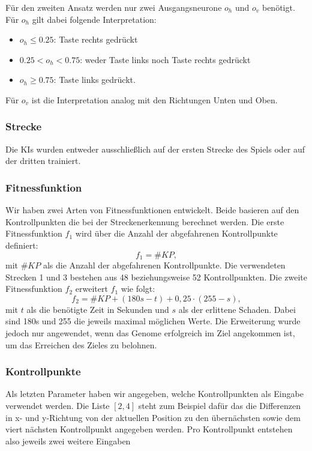 \documentclass[11pt,final,journal,a4paper,towside,towcolumn]{IEEEtran}
\begin{document}
Für den zweiten Ansatz werden nur zwei Ausgangsneurone $o_h$ und $o_v$ benötigt. Für $o_h$ gilt dabei folgende Interpretation:
\begin{itemize}
	\item $o_h\leq 0.25$: Taste rechts gedrückt
	\item $0.25 < o_h <0.75$: weder Taste links noch Taste rechts gedrückt
	\item $o_h\geq 0.75$: Taste links gedrückt.
\end{itemize}
Für $o_v$ ist die Interpretation analog mit den Richtungen Unten und Oben.

\subsubsection*{Strecke}
Die \acp{KI} wurden entweder ausschließlich auf der ersten Strecke des Spiels oder auf der dritten trainiert.

\subsubsection*{Fitnessfunktion}
Wir haben zwei Arten von Fitnessfunktionen entwickelt. Beide basieren auf den Kontrollpunkten die bei der Streckenerkennung berechnet werden.
Die erste Fitnessfunktion $f_1$ wird über die Anzahl der abgefahrenen Kontrollpunkte definiert:
\begin{equation}
f_1 = \#KP,
\end{equation}
mit $\#KP$ als die Anzahl der abgefahrenen Kontrollpunkte. Die verwendeten Strecken 1 und 3 bestehen aus 48 beziehungsweise 52 Kontrollpunkten.
Die zweite Fitnessfunktion $f_2$ erweitert $f_1$ wie folgt:
\begin{equation}
f_2=\#KP + (180s-t) + 0,25\cdot(255 - s),
\end{equation}
mit $t$ als die benötigte Zeit in Sekunden und $s$ als der erlittene Schaden. Dabei sind 180s und 255 die jeweils maximal möglichen Werte. Die Erweiterung wurde jedoch nur angewendet, wenn das Genome erfolgreich im Ziel angekommen ist, um das Erreichen des Zieles zu belohnen.

\subsubsection*{Kontrollpunkte}
Als letzten Parameter haben wir angegeben, welche Kontrollpunkten als Eingabe verwendet werden. Die Liste $\left[2, 4\right]$ steht zum Beispiel dafür das die Differenzen in x- und y-Richtung von der aktuellen Position zu den übernächsten sowie dem viert nächsten Kontrollpunkt angegeben werden. Pro Kontrollpunkt entstehen also jeweils zwei weitere Eingaben
\end{document}
